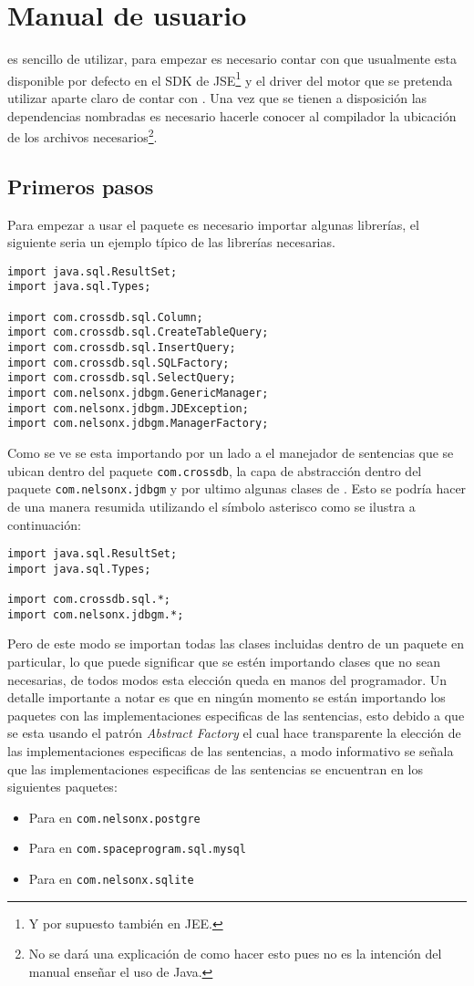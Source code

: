 \chapter{Manual de usuario}
\jj es sencillo de utilizar, para empezar es necesario contar con \jd que usualmente esta disponible por defecto en el SDK de JSE\footnote{Y por supuesto también en JEE.} y el driver del motor que se pretenda utilizar aparte claro de contar con \jj. Una vez que se tienen a disposición las dependencias nombradas es necesario hacerle conocer al compilador la ubicación de los archivos necesarios\footnote{No se dará una explicación de como hacer esto pues no es la intención del manual enseñar el uso de Java.}.
%
\section{Primeros pasos}
Para empezar a usar el paquete es necesario importar algunas librerías, el siguiente seria un ejemplo típico de las librerías necesarias.
%
\begin{lstlisting}[title=Librerías a importar]
import java.sql.ResultSet;
import java.sql.Types;

import com.crossdb.sql.Column;
import com.crossdb.sql.CreateTableQuery;
import com.crossdb.sql.InsertQuery;
import com.crossdb.sql.SQLFactory;
import com.crossdb.sql.SelectQuery;
import com.nelsonx.jdbgm.GenericManager;
import com.nelsonx.jdbgm.JDException;
import com.nelsonx.jdbgm.ManagerFactory;
\end{lstlisting}
%
Como se ve se esta importando por un lado a el manejador de sentencias que se ubican dentro del paquete \verb=com.crossdb=, la capa de abstracción dentro del paquete \verb=com.nelsonx.jdbgm= y por ultimo algunas clases de \jd. Esto se podría hacer de una manera resumida utilizando el símbolo asterisco como se ilustra a continuación:
%
\begin{lstlisting}[title=Librerías a importar forma resumida]
import java.sql.ResultSet;
import java.sql.Types;

import com.crossdb.sql.*;
import com.nelsonx.jdbgm.*;
\end{lstlisting}
%
Pero de este modo se importan todas las clases incluidas dentro de un paquete en particular, lo que puede significar que se estén importando clases que no sean necesarias, de todos modos esta elección queda en manos del programador. Un detalle importante a notar es que en ningún momento se están importando los paquetes con las implementaciones especificas de las sentencias, esto debido a que se esta usando el patrón \textit{Abstract Factory} el cual hace transparente la elección de las implementaciones especificas de las sentencias, a modo informativo se señala que las implementaciones especificas de las sentencias se encuentran en los siguientes paquetes:
%
\begin{itemize}
\item Para \p en \verb=com.nelsonx.postgre=
\item Para \m en \verb=com.spaceprogram.sql.mysql=
\item Para \s en \verb=com.nelsonx.sqlite=
\end{itemize} 

